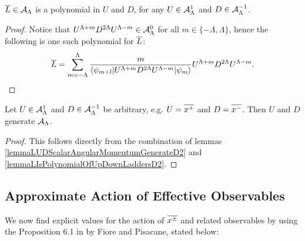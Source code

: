 \begin{lemma}\label{lemmaLIsPolynomialOfUpDownLaddersD2}
$\overline{L} \in \mathcal A_\Lambda$ is a polynomial in $U$ and $D$, for any $U \in \mathcal A^1_\Lambda$ and $D \in \mathcal A^{-1}_\Lambda$.
\end{lemma}
\begin{proof}
Notice that $U^{\Lambda+m} D^{2\Lambda}U^{\Lambda-m} \in \mathcal A^0_\Lambda$ for all $m \in \{-\Lambda, \Lambda\}$, hence the following is one such polynomial for $\overline{L}$:
\begin{equation}
    \overline{L} = \sum_{m = -\Lambda}^\Lambda \frac{m}{\langle \psi_{m+l}| U^{\Lambda+m} D^{2\Lambda}U^{\Lambda-m} | \psi_{m}\rangle} U^{\Lambda+m} D^{2\Lambda}U^{\Lambda-m}.
\end{equation}
\end{proof}

\begin{theorem}
Let $U \in \mathcal A^1_\Lambda$ and $D \in \mathcal A^{-1}_\Lambda$ be arbitrary, e.g. $U = \overline{x^+}$ and $D = \overline{x^-}$. Then $U$ and $D$ generate $\mathcal A_\Lambda$.
\end{theorem}
\begin{proof}
This follows directly from the combination of lemmas \ref{lemmaLUDScalarAngularMomentumGenerateD2} and \ref{lemmaLIsPolynomialOfUpDownLaddersD2}.
\end{proof}

\subsection{Approximate Action of Effective Observables}

We now find explicit values for the action of $\overline{x^\pm}$ and related observables by using the Proposition 6.1 in \cite{Fiore2018} by Fiore and Pisacane, stated below:


